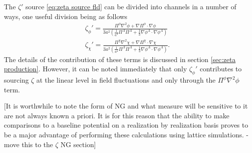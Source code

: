 The $\zeta'$ source \eqref{eq:zeta source fld} can be divided into channels in a number of ways, one useful division being as follows
\begin{align}
  \zeta_\phi' = \frac{\Pi^\phi\nabla^2\phi + \nabla\Pi^\phi\cdot\nabla\phi}{3a^2\left(\frac{1}{a^4}\Pi^A\Pi^A + \frac{1}{3}\nabla\phi^A\cdot\nabla\phi^A \right)} \\
  \zeta_\chi' = \frac{\Pi^\chi\nabla^2\chi + \nabla\Pi^\chi\cdot\nabla\chi}{3a^2\left(\frac{1}{a^4}\Pi^A\Pi^A + \frac{1}{3}\nabla\phi^A\cdot\nabla\phi^A \right)}.
\end{align}
The details of the contribution of these terms is discussed in section \ref{sec:zeta production}.
However, it can be noted immediately that only $\zeta_\phi'$ contributes to sourcing $\zeta$ at the linear level in field fluctuations and only through the $\Pi^\phi\nabla^2\phi$ term.

[It is worthwhile to note the form of NG and what measure will be sensitive to it are not always known a priori.
It is for this reason that the ability to make comparisons to a baseline potential on a realization by realization basis proves to be a major advantage of performing these calculations using lattice simulations. - move this to the $\zeta$ NG section]


